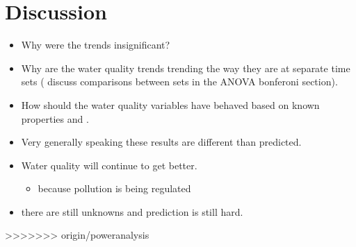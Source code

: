 \section{Discussion}
\begin{itemize}
	\item Why were the trends insignificant?
	\item Why are the water quality trends trending the way they are at separate time sets ( discuss comparisons between sets in the ANOVA bonferoni section).
	\item How should the water quality variables have behaved based on known properties and \citep{robinson2008ph}.
	\item Very generally speaking these results are different than \citep{robinson2008ph} predicted.
	\item Water quality will continue to get better.
	\begin{itemize}
		\item because pollution is being regulated
	\end{itemize}
	\item there are still unknowns and prediction is still hard.
\end{itemize}
	
>>>>>>> origin/poweranalysis
